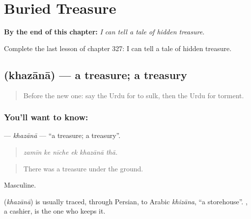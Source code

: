 
\chapter{Buried Treasure}
\label{ch:ur-buried-treasure}

\begin{chapteropening}
\textbf{By the end of this chapter:} \emph{I can tell a tale of hidden treasure.}

Complete the last lesson of chapter 327: I can tell a tale of hidden treasure.
\end{chapteropening}

\section[\texorpdfstring{\ur{خزانہ} (khazānā)}{خزانہ (khazānā)}]{ (khazānā) — a treasure; a treasury}

\label{lesson:UR-C327-khazana}



\begin{quote}
Before the new one: say the Urdu for to sulk, then the Urdu for torment.
\end{quote}

\subsection*{You'll want to know: }
\textbf{} — \emph{khazānā} — \textquotedblleft{}a treasure; a treasury\textquotedblright{}.

\begin{quote}
     
\end{quote}

\begin{quote}
\emph{zamīn ke nīche ek khazānā thā.}
\end{quote}

\begin{quote}
There was a treasure under the ground.
\end{quote}

Masculine.

\begin{cousinweb}
\textbf{} (\emph{khazānā}) is usually traced, through Persian, to Arabic \emph{khizāna}, \textquotedblleft{}a storehouse\textquotedblright{}. \textbf{}, a cashier, is the one who keeps it.
\end{cousinweb}

